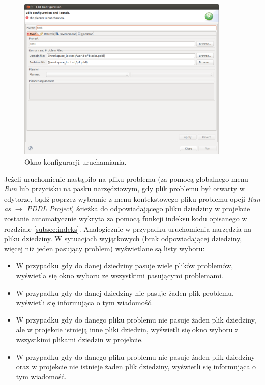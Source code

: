 \begin{figure}[h!]
    \centering
    \includegraphics[width=0.9\textwidth]{img/run_configuration_window}
    \caption{Okno konfiguracji uruchamiania.}
    \label{fig:run_configuration_window}
\end{figure}

Jeżeli uruchomienie nastąpiło na pliku problemu (za pomocą globalnego menu \emph{Run} lub przycisku na pasku narzędziowym, gdy plik problemu był otwarty w edytorze, bądź poprzez wybranie z menu kontekstowego pliku problemu opcji \emph{Run as $\rightarrow$ PDDL Project}) ścieżka do odpowiadającego pliku dziedziny w projekcie zostanie automatycznie wykryta za pomocą funkcji indeksu kodu opisanego w rozdziale \ref{subsec:indeks}. Analogicznie w przypadku uruchomienia narzędzia na pliku dziedziny. W sytuacjach wyjątkowych (brak odpowiadającej dziedziny, więcej niż jeden pasujący problem) wyświetlane są listy wyboru:
\begin{itemize}
\item W przypadku gdy do danej dziedziny pasuje wiele plików problemów, wyświetla się okno wyboru ze wszystkimi pasującymi problemami.
\item W przypadku gdy do danej dziedziny nie pasuje żaden plik problemu, wyświetli się informująca o tym wiadomość.
\item W przypadku gdy do danego pliku problemu nie pasuje żaden plik dziedziny, ale w projekcie istnieją inne pliki dziedzin, wyświetli się okno wyboru z wszystkimi plikami dziedzin w projekcie.
\item W przypadku gdy do danego pliku problemu nie pasuje żaden plik dziedziny oraz w projekcie nie istnieje żaden plik  dziedziny, wyświetli się informująca o tym wiadomość.
\end{itemize}


